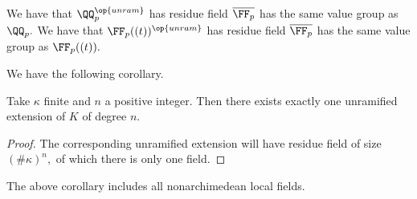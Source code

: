 \documentclass[../notes.tex]{subfiles}
\begin{document}
\begin{example}
	We have that $\QQ_p^{\op{unram}}$ has residue field $\overline{\FF_p}$ has the same value group as $\QQ_p.$ We have that $\FF_p((t))^{\op{unram}}$ has residue field $\overline{\FF_p}$ has the same value group as $\FF_p((t)).$
\end{example}
We have the following corollary.
\begin{corollary}
	Take $\kappa$ finite and $n$ a positive integer. Then there exists exactly one unramified extension of $K$ of degree $n.$
\end{corollary}
\begin{proof}
	The corresponding unramified extension will have residue field of size $(\#\kappa)^n,$ of which there is only one field.
\end{proof}
\begin{example}
	The above corollary includes all nonarchimedean local fields.
\end{example}
\end{document}
